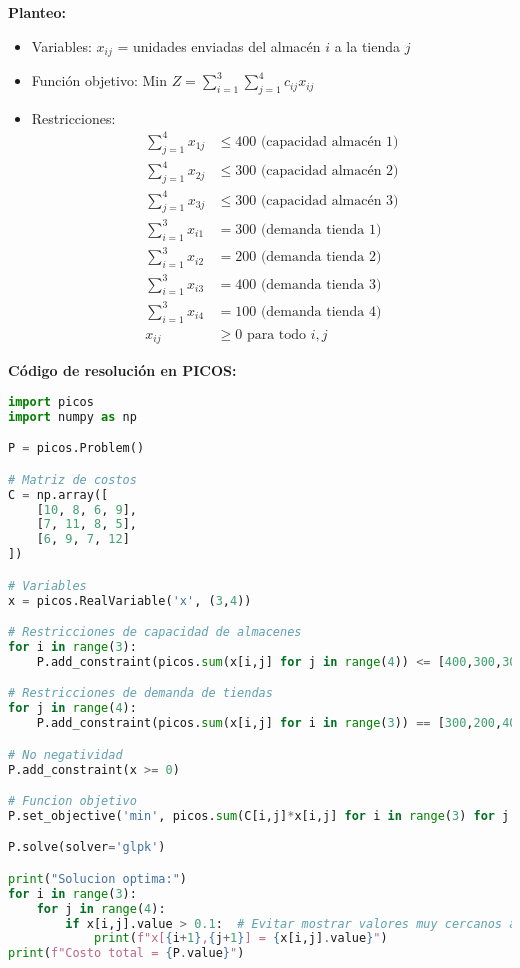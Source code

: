 \documentclass[12pt]{article}
\begin{document}
\textbf{Planteo:}
\begin{itemize}
\item Variables: $x_{ij}$ = unidades enviadas del almacén $i$ a la tienda $j$
\item Función objetivo: Min $Z = \sum_{i=1}^3 \sum_{j=1}^4 c_{ij}x_{ij}$
\item Restricciones:
  \begin{align*}
  \sum_{j=1}^4 x_{1j} &\leq 400 \text{ (capacidad almacén 1)} \\
  \sum_{j=1}^4 x_{2j} &\leq 300 \text{ (capacidad almacén 2)} \\
  \sum_{j=1}^4 x_{3j} &\leq 300 \text{ (capacidad almacén 3)} \\
  \sum_{i=1}^3 x_{i1} &= 300 \text{ (demanda tienda 1)} \\
  \sum_{i=1}^3 x_{i2} &= 200 \text{ (demanda tienda 2)} \\
  \sum_{i=1}^3 x_{i3} &= 400 \text{ (demanda tienda 3)} \\
  \sum_{i=1}^3 x_{i4} &= 100 \text{ (demanda tienda 4)} \\
  x_{ij} &\geq 0 \text{ para todo } i,j
  \end{align*}
\end{itemize}

\textbf{Código de resolución en PICOS:}
\begin{lstlisting}[language=Python]
import picos
import numpy as np

P = picos.Problem()

# Matriz de costos
C = np.array([
    [10, 8, 6, 9],
    [7, 11, 8, 5],
    [6, 9, 7, 12]
])

# Variables
x = picos.RealVariable('x', (3,4))

# Restricciones de capacidad de almacenes
for i in range(3):
    P.add_constraint(picos.sum(x[i,j] for j in range(4)) <= [400,300,300][i])

# Restricciones de demanda de tiendas
for j in range(4):
    P.add_constraint(picos.sum(x[i,j] for i in range(3)) == [300,200,400,100][j])

# No negatividad
P.add_constraint(x >= 0)

# Funcion objetivo
P.set_objective('min', picos.sum(C[i,j]*x[i,j] for i in range(3) for j in range(4)))

P.solve(solver='glpk')

print("Solucion optima:")
for i in range(3):
    for j in range(4):
        if x[i,j].value > 0.1:  # Evitar mostrar valores muy cercanos a cero
            print(f"x[{i+1},{j+1}] = {x[i,j].value}")
print(f"Costo total = {P.value}")
\end{lstlisting}
\end{document}
